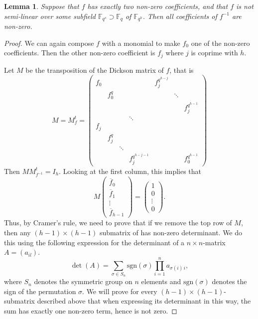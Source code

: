 \documentclass[a4paper]{article}
\newtheorem{lm}[thm]{Lemma}
\theoremstyle{definition}
\newcommand{\FF}{\mathbb F}
\begin{document}
\begin{lm}
 \label{LmTwoNonZeroCoeff}
 Suppose that $f$ has exactly two non-zero coefficients, and that $f$ is not semi-linear over some subfield $\FF_{q^s} \supset \FF_q$ of $\FF_{q^h}$.
 Then all coefficients of $f^{-1}$ are non-zero.
\end{lm}

\begin{proof}
We can again compose $f$ with a monomial to make $f_0$ one of the non-zero coefficients.
Then the other non-zero coefficient is $f_j$ where $j$ is coprime with $h$.

Let $M$ be the transposition of the Dickson matrix of $f$, that is
\[
 M = M_f^t = \begin{pmatrix}
  f_0  & & & & f_j^{q^{h-j}} \\
  & f_0^q  & & & & \ddots \\
  & & & & & & f_j^{q^{h-1}}         \\ 
  & & & \ddots         \\
  f_j    \\
  & f_j^q \\
  & & \ddots \\
 & & & f_j^{q^{h-j-1}} & & & f_0^{q^{h-1}}
 \end{pmatrix}
\]
Then $M M_{f^{-1}}^t = I_h$.
Looking at the first column, this implies that
\[
 M \begin{pmatrix}
 \overline f_0 \\ \overline f_1 \\ \vdots \\ \overline f_{h-1}
 \end{pmatrix}
 = \begin{pmatrix}
 1 \\ 0 \\ \vdots \\ 0
 \end{pmatrix}.
\]
Thus, by Cramer's rule, we need to prove that if we remove the top row of $M$, then any $(h-1) \times (h-1)$ submatrix of has non-zero determinant.
We do this using the following expression for the determinant of a $n \times n$-matrix $A=(a_{il})$.
\[ \det(A) = \sum_{\sigma \in S_n} \text{sgn}(\sigma)  \prod_{i=1}^n a_{\sigma(i) \, i}, \]
where $S_n$ denotes the symmetric group on $n$ elements and $\text{sgn}(\sigma)$ denotes the sign of the permutation $\sigma$.
We will prove for every $(h-1) \times (h-1)$-submatrix described above that when expressing its determinant in this way, the sum has exactly one non-zero term, hence is not zero.


\end{proof}
\end{document}
